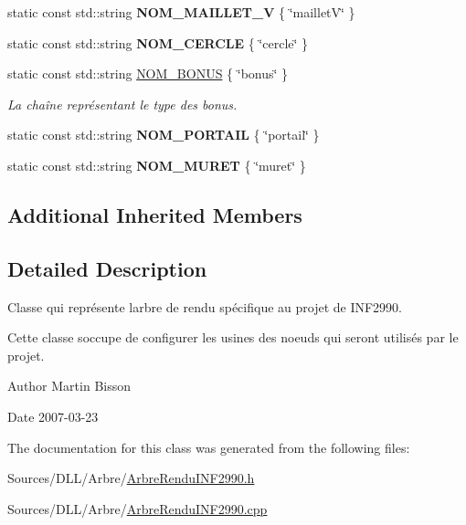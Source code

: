 \begin{DoxyCompactItemize}
static const std\+::string {\bfseries N\+O\+M\+\_\+\+M\+A\+I\+L\+L\+E\+T\+\_\+V} \{ \char`\"{}mailletV\char`\"{} \}
\item 
static const std\+::string {\bfseries N\+O\+M\+\_\+\+C\+E\+R\+C\+LE} \{ \char`\"{}cercle\char`\"{} \}
\item 
static const std\+::string \hyperlink{group__inf2990_gafd57ee426cc672e15633e991ae1af778}{N\+O\+M\+\_\+\+B\+O\+N\+US} \{ \char`\"{}bonus\char`\"{} \}
\begin{DoxyCompactList}\small\item\em La chaîne représentant le type des bonus. \end{DoxyCompactList}\item 
static const std\+::string {\bfseries N\+O\+M\+\_\+\+P\+O\+R\+T\+A\+IL} \{ \char`\"{}portail\char`\"{} \}
\item 
static const std\+::string {\bfseries N\+O\+M\+\_\+\+M\+U\+R\+ET} \{ \char`\"{}muret\char`\"{} \}
\end{DoxyCompactItemize}
\subsection*{Additional Inherited Members}


\subsection{Detailed Description}
Classe qui représente l\textquotesingle{}arbre de rendu spécifique au projet de I\+N\+F2990. 

Cette classe s\textquotesingle{}occupe de configurer les usines des noeuds qui seront utilisés par le projet.

\begin{DoxyAuthor}{Author}
Martin Bisson 
\end{DoxyAuthor}
\begin{DoxyDate}{Date}
2007-\/03-\/23 
\end{DoxyDate}


The documentation for this class was generated from the following files\+:\begin{DoxyCompactItemize}
\item 
Sources/\+D\+L\+L/\+Arbre/\hyperlink{_arbre_rendu_i_n_f2990_8h}{Arbre\+Rendu\+I\+N\+F2990.\+h}\item 
Sources/\+D\+L\+L/\+Arbre/\hyperlink{_arbre_rendu_i_n_f2990_8cpp}{Arbre\+Rendu\+I\+N\+F2990.\+cpp}\end{DoxyCompactItemize}
